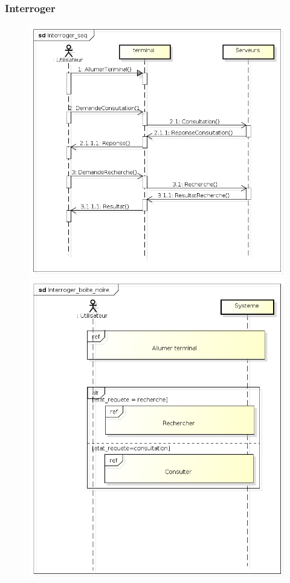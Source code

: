 \documentclass[11pt, titlepage]{report}
\begin{document}
\subsubsection{Interroger}
\begin{figure}[h!]
\begin{center}
\includegraphics[scale=.4]{../images/diagrammes/sysml/sequence/interroger.png} 
\includegraphics[scale=.4]{../images/diagrammes/sysml/sequence/interroger_boite_noire.png} 

\end{center}
\end{figure}
\end{document}

